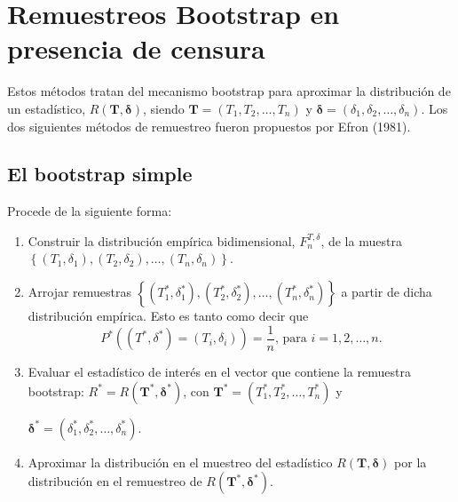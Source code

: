 \documentclass[
]{book}
\theoremstyle{break}
\theoremstyle{definition}
\theoremstyle{definition}
\theoremstyle{definition}
\theoremstyle{definition}
\theoremstyle{remark}
\begin{document}
\hypertarget{remuestreos-bootstrap-en-presencia-de-censura}{%
\section{Remuestreos Bootstrap en presencia de censura}\label{remuestreos-bootstrap-en-presencia-de-censura}}

Estos métodos tratan del mecanismo bootstrap para aproximar la
distribución de un estadístico, \(R\left( \mathbf{T}, \boldsymbol{\delta} \right)\), siendo \(\mathbf{T}=\left( T_1, T_2, \ldots,T_n \right)\) y \(\boldsymbol{\delta}=\left( \delta _1,\delta_2, \ldots ,\delta _n \right)\). Los dos siguientes métodos de
remuestreo fueron propuestos por Efron (1981).

\hypertarget{el-bootstrap-simple}{%
\subsection{El bootstrap simple}\label{el-bootstrap-simple}}

Procede de la siguiente forma:

\begin{enumerate}
\def\labelenumi{\arabic{enumi}.}
\item
  Construir la distribución empírica bidimensional,
  \(F_n^{T,\delta }\), de la muestra
  \(\left\{ \left( T_1,\delta _1 \right), \left( T_2,\delta _2 \right), \ldots, \left( T_n,\delta _n \right) \right\}\).
\item
  Arrojar remuestras \(\left\{ \left( T_1^{\ast},\delta _1^{\ast} \right), \left( T_2^{\ast},\delta _2^{\ast} \right), \ldots, \left( T_n^{\ast},\delta _n^{\ast} \right) \right\}\)
  a partir de dicha distribución empírica. Esto es tanto como decir
  que\[P^{\ast}\left( \left( T^{\ast},\delta^{\ast} \right) =\left( T_i,\delta
  _i \right) \right) =\frac{1}{n}\text{, para }i=1,2,\ldots ,n\text{.}\]
\item
  Evaluar el estadístico de interés en el vector que contiene la
  remuestra bootstrap: \(R^{\ast}=R\left( \mathbf{T}^{\ast}, \boldsymbol{\delta}^{\ast} \right)\), con
  \(\mathbf{T}^{\ast} =\left( T_1^{\ast},T_2^{\ast},\ldots ,T_n^{\ast} \right)\) y

  \(\boldsymbol{\delta}^{\ast}=\left( \delta _1^{\ast},\delta _2^{\ast},\ldots ,\delta _n^{\ast} \right)\).
\item
  Aproximar la distribución en el muestreo del estadístico
  \(R\left( \mathbf{T}, \boldsymbol{\delta} \right)\) por la
  distribución en el remuestreo de \(R\left( \mathbf{T}^{\ast},\boldsymbol{\delta}^{\ast} \right)\).
\end{enumerate}
\end{document}
